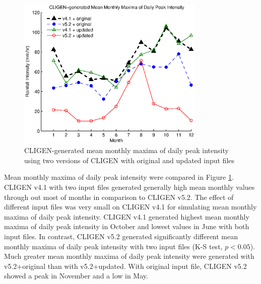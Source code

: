 \begin{figure}[htbp]
  \centering
    \includegraphics[width=0.8\textwidth]{./img/cligen_monthly_max_int_by_month}
  \caption{CLIGEN-generated mean monthly maxima of daily peak intensity
using two versions of CLIGEN with original and updated input files}
  \label{fig:cligen_dr_monthly_max_int_by_month}
\end{figure}

Mean monthly maxima of daily peak intensity were compared in Figure
\ref{fig:cligen_dr_monthly_max_int_by_month}. CLIGEN v4.1 with two input files
generated generally high mean monthly values through out most of months in
comparison to CLIGEN v5.2. The effect of different input files was very small
on CLIGEN v4.1 for simulating mean monthly maxima of daily peak intensity.
CLIGEN v4.1 generated highest mean monthly maxima of daily peak intensity in
October and lowest values in June with both input files. In contrast, CLIGEN
v5.2 generated significantly different mean monthly maxima of daily peak
intensity with two input files (K-S test, $p<0.05$). Much greater mean monthly
maxima of daily peak intensity were generated with v5.2+original than with
v5.2+updated. With original input file, CLIGEN v5.2 showed a peak in November
and a low in May.


